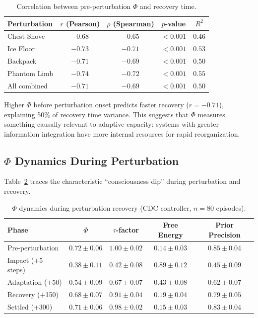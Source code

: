 \documentclass[11pt,a4paper]{article}
\begin{document}
\begin{table}[h]
\centering
\caption{Correlation between pre-perturbation $\Phi$ and recovery time.}
\label{tab:phi_predict}
\begin{tabular}{lcccc}
\toprule
\textbf{Perturbation} & \textbf{$r$ (Pearson)} & \textbf{$\rho$ (Spearman)} & \textbf{$p$-value} & \textbf{$R^2$} \\
\midrule
Chest Shove    & $-0.68$ & $-0.65$ & $< 0.001$ & $0.46$ \\
Ice Floor      & $-0.73$ & $-0.71$ & $< 0.001$ & $0.53$ \\
Backpack       & $-0.71$ & $-0.69$ & $< 0.001$ & $0.50$ \\
Phantom Limb   & $-0.74$ & $-0.72$ & $< 0.001$ & $0.55$ \\
\midrule
All combined   & $-0.71$ & $-0.69$ & $< 0.001$ & $0.50$ \\
\bottomrule
\end{tabular}
\end{table}

Higher $\Phi$ before perturbation onset predicts faster recovery ($r = -0.71$), explaining 50\% of recovery time variance.
This suggests that $\Phi$ measures something causally relevant to adaptive capacity: systems with greater information integration have more internal resources for rapid reorganization.

\subsection{$\Phi$ Dynamics During Perturbation}

Table~\ref{tab:phi_dynamics} traces the characteristic ``consciousness dip'' during perturbation and recovery.

\begin{table}[h]
\centering
\caption{$\Phi$ dynamics during perturbation recovery (CDC controller, $n = 80$ episodes).}
\label{tab:phi_dynamics}
\begin{tabular}{lcccc}
\toprule
\textbf{Phase} & \textbf{$\Phi$} & \textbf{$\tau$-factor} & \textbf{Free Energy} & \textbf{Prior Precision} \\
\midrule
Pre-perturbation     & $0.72 \pm 0.06$ & $1.00 \pm 0.02$ & $0.14 \pm 0.03$ & $0.85 \pm 0.04$ \\
Impact ($+$5 steps)  & $0.38 \pm 0.11$ & $0.42 \pm 0.08$ & $0.89 \pm 0.12$ & $0.45 \pm 0.09$ \\
Adaptation ($+$50)   & $0.54 \pm 0.09$ & $0.67 \pm 0.07$ & $0.43 \pm 0.08$ & $0.62 \pm 0.07$ \\
Recovery ($+$150)    & $0.68 \pm 0.07$ & $0.91 \pm 0.04$ & $0.19 \pm 0.04$ & $0.79 \pm 0.05$ \\
Settled ($+$300)     & $0.71 \pm 0.06$ & $0.98 \pm 0.02$ & $0.15 \pm 0.03$ & $0.83 \pm 0.04$ \\
\bottomrule
\end{tabular}
\end{table}
\end{document}
